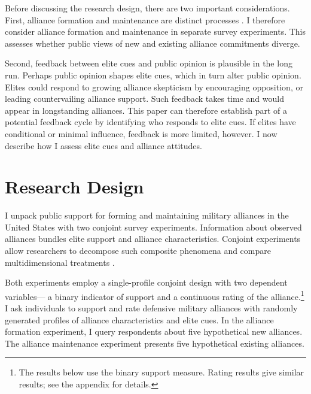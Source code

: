\documentclass[12pt]{article}
\begin{document}
Before discussing the research design, there are two important considerations. 
First, alliance formation and maintenance are distinct processes \citep{Snyder1997}. 
I therefore consider alliance formation and maintenance in separate survey experiments.
This assesses whether public views of new and existing alliance commitments diverge. 


Second, feedback between elite cues and public opinion is plausible in the long run. 
Perhaps public opinion shapes elite cues, which in turn alter public opinion. 
Elites could respond to growing alliance skepticism by encouraging opposition, or leading countervailing alliance support.
Such feedback takes time and would appear in longstanding alliances.
This paper can therefore establish part of a potential feedback cycle by identifying who responds to elite cues.  
If elites have conditional or minimal influence, feedback is more limited, however.
I now describe how I assess elite cues and alliance attitudes. 



\section{Research Design}



I unpack public support for forming and maintaining military alliances in the United States with two conjoint survey experiments. 
Information about observed alliances bundles elite support and alliance characteristics. 
Conjoint experiments allow researchers to decompose such composite phenomena and compare multidimensional treatments \citep{Hainmuelleretal2014}. 


Both experiments employ a single-profile conjoint design with two dependent variables--- a binary indicator of support and a continuous rating of the alliance.\footnote{The results below use the binary support measure. Rating results give similar results; see the appendix for details.} 
I ask individuals to support and rate defensive military alliances with randomly generated profiles of alliance characteristics and elite cues. 
In the alliance formation experiment, I query respondents about five hypothetical new alliances. 
The alliance maintenance experiment presents five hypothetical existing alliances.
\end{document}
